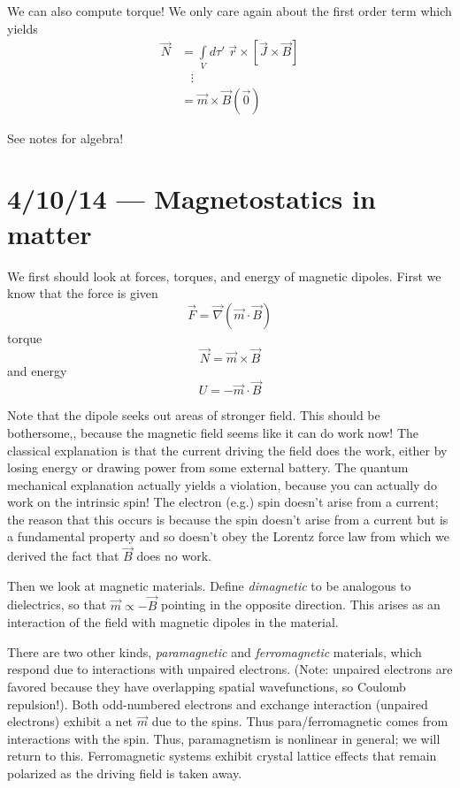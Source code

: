 \documentclass[10pt]{report}
\begin{document}
We can also compute torque! We only care again about the first order term which yields
\begin{align}
    \vec{N} &= \int\limits_{V}^{}d\tau'\;\vec{r}\times\left[ \vec{J}\times\vec{B} \right]\\
    &\;\;\;\vdots\\
    &= \vec{m} \times \vec{B}(\vec{0})
\end{align}

See notes for algebra!

\chapter{4/10/14 --- Magnetostatics in matter}

We first should look at forces, torques, and energy of magnetic dipoles. First we know that the force is given
\begin{equation}
    \vec{F} = \vec{\nabla}(\vec{m}\cdot \vec{B})
\end{equation}
torque
\begin{equation}
    \vec{N} = \vec{m}\times \vec{B}
\end{equation}
and energy
\begin{equation}
    U = -\vec{m}\cdot \vec{B}
\end{equation}

Note that the dipole seeks out areas of stronger field. This should be bothersome,, because the magnetic field seems like it can do work now! The classical explanation is that the current driving the field does the work, either by losing energy or drawing power from some external battery. The quantum mechanical explanation actually yields a violation, because you can actually do work on the intrinsic spin! The electron (e.g.) spin doesn't arise from a current; the reason that this occurs is because the spin doesn't arise from a current but is a fundamental property and so doesn't obey the Lorentz force law from which we derived the fact that $\vec{B}$ does no work.

Then we look at magnetic materials. Define \emph{dimagnetic} to be analogous to dielectrics, so that $\vec{m} \propto -\vec{B}$ pointing in the opposite direction. This arises as an interaction of the field with magnetic dipoles in the material.

There are two other kinds, \emph{paramagnetic} and \emph{ferromagnetic} materials, which respond due to interactions with unpaired electrons. (Note: unpaired electrons are favored because they have overlapping spatial wavefunctions, so Coulomb repulsion!). Both odd-numbered electrons and exchange interaction (unpaired electrons) exhibit a net $\vec{m}$ due to the spins. Thus para/ferromagnetic comes from interactions with the spin. Thus, paramagnetism is nonlinear in general; we will return to this. Ferromagnetic systems exhibit crystal lattice effects that remain polarized as the driving field is taken away.
\end{document}
